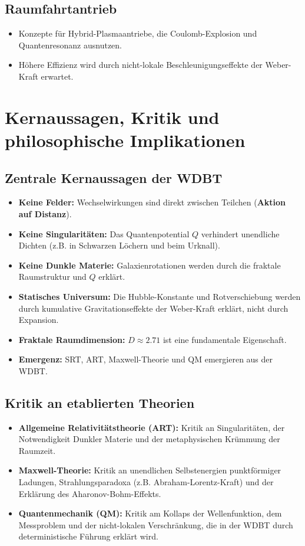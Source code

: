 \documentclass[11pt, a4paper]{article}
\begin{document}
\subsection{Raumfahrtantrieb}
\label{subsec:antrieb}
\begin{itemize}
    \item Konzepte für Hybrid-Plasmaantriebe, die Coulomb-Explosion und Quantenresonanz ausnutzen.
    \item Höhere Effizienz wird durch nicht-lokale Beschleunigungseffekte der Weber-Kraft erwartet.
\end{itemize}

\section{Kernaussagen, Kritik und philosophische Implikationen}
\label{sec:kern_kritik}

\subsection{Zentrale Kernaussagen der WDBT}
\label{subsec:kernaussagen}
\begin{itemize}
    \item \textbf{Keine Felder:} Wechselwirkungen sind direkt zwischen Teilchen (\textbf{Aktion auf Distanz}).
    \item \textbf{Keine Singularitäten:} Das Quantenpotential $Q$ verhindert unendliche Dichten (z.B. in Schwarzen Löchern und beim Urknall).
    \item \textbf{Keine Dunkle Materie:} Galaxienrotationen werden durch die fraktale Raumstruktur und $Q$ erklärt.
    \item \textbf{Statisches Universum:} Die Hubble-Konstante und Rotverschiebung werden durch kumulative Gravitationseffekte der Weber-Kraft erklärt, nicht durch Expansion.
    \item \textbf{Fraktale Raumdimension:} $D \approx 2.71$ ist eine fundamentale Eigenschaft.
    \item \textbf{Emergenz:} SRT, ART, Maxwell-Theorie und QM emergieren aus der WDBT.
\end{itemize}

\subsection{Kritik an etablierten Theorien}
\label{subsec:kritik}
\begin{itemize}
    \item \textbf{Allgemeine Relativitätstheorie (ART):} Kritik an Singularitäten, der Notwendigkeit Dunkler Materie und der \glqq metaphysischen\grqq{} Krümmung der Raumzeit.
    \item \textbf{Maxwell-Theorie:} Kritik an unendlichen Selbstenergien punktförmiger Ladungen, Strahlungsparadoxa (z.B. Abraham-Lorentz-Kraft) und der Erklärung des Aharonov-Bohm-Effekts.
    \item \textbf{Quantenmechanik (QM):} Kritik am Kollaps der Wellenfunktion, dem Messproblem und der nicht-lokalen Verschränkung, die in der WDBT durch deterministische Führung erklärt wird.
\end{itemize}
\end{document}
